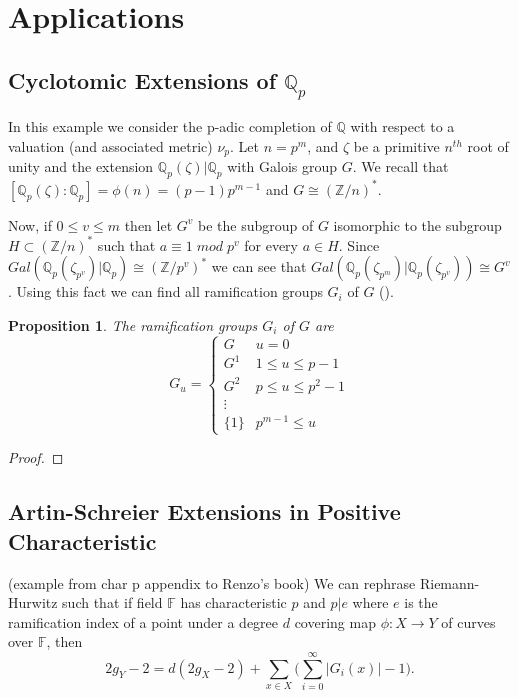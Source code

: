\documentclass[paper=a4, fontsize=11pt]{scrartcl} %
\numberwithin{equation}{section} %
\numberwithin{figure}{section} %
\numberwithin{table}{section} %
\theoremstyle{break}
\newtheorem{prop}{Proposition}
\begin{document}
\section{Applications}
\subsection{Cyclotomic Extensions of $\mathbb{Q}_p$}
In this example we consider the p-adic completion of $\mathbb{Q}$ with respect to a valuation (and associated metric) $\nu_p$. Let $n=p^m$, and $\zeta$ be a primitive $n^{th}$ root of unity and the extension $\mathbb{Q}_p(\zeta)|\mathbb{Q}_p$ with Galois group $G$. We recall that $[\mathbb{Q}_p(\zeta):\mathbb{Q}_p]=\phi(n)=(p-1)p^{m-1}$ and $G\cong (\mathbb{Z}/n)^*$. 

Now, if $0 \leq v \leq m$ then let $G^v$ be the subgroup of $G$ isomorphic to the subgroup $H \subset (\mathbb{Z}/n)^*$ such that $a \equiv 1\;mod\;p^v$ for every $a\in H$. Since $Gal(\mathbb{Q}_p(\zeta_{p^v})|\mathbb{Q}_p) \cong (\mathbb{Z}/p^v)^*$ we can see that $Gal(\mathbb{Q}_p(\zeta_{p^m})|\mathbb{Q}_p(\zeta_{p^v})) \cong G^v$. Using this fact we can find all ramification groups $G_i$ of $G$ (\cite{Serre}).
\begin{prop}
The ramification groups $G_i$ of $G$ are
\[ G_u = \begin{cases} 
      G    & u=0 \\
      G^1  & 1 \leq u \leq p -1 \\
      G^2  & p \leq u \leq p^2 -1\\
      \vdots \\
      \{1\} & p^{m-1} \leq u
   \end{cases}
\]
\end{prop}

\begin{proof}
\end{proof}

\subsection{Artin-Schreier Extensions in Positive Characteristic}
(example from char p appendix to Renzo's book)
We can rephrase Riemann-Hurwitz such that if field $\mathbb{F}$ has characteristic $p$ and $p|e$ where $e$ is the ramification index of a point under a degree $d$ covering map $\phi:X \to Y$ of curves over $\mathbb{F}$, then
$$
2g_Y -2 = d(2g_X -2) + \sum_{x\in X} \big( \sum^{\infty}_{i=0}|G_i(x)| -1 \big).
$$
\end{document}
